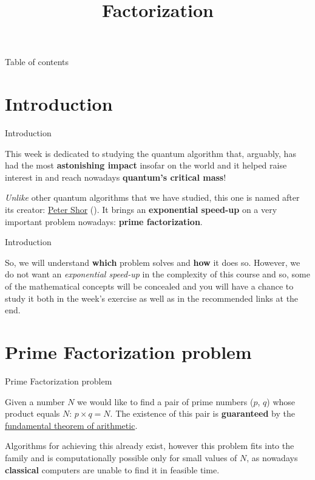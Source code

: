 \documentclass[aspectratio=43]{beamer}
\title{\q Factorization}
\begin{document}
\begin{frame}
	\titlepage
\end{frame}


\begin{frame}{Table of contents}
	\begin{card}
		\tableofcontents
	\end{card}
\end{frame}


\section{Introduction}
\begin{frame}{Introduction}
    \begin{card}
        This week is dedicated to studying the quantum algorithm that, arguably, has had the most \textbf{astonishing impact} insofar on the world and it helped raise interest in \qc and reach nowadays \textbf{quantum's critical mass}!
    \end{card}
    \begin{card}
        \textit{Unlike} other quantum algorithms that we have studied, this one is named after its creator: \href{https://en.wikipedia.org/wiki/Peter_Shor}{Peter Shor} (\textbf{\sa}). It brings an \textbf{exponential speed-up} on a very important problem nowadays: \textbf{prime factorization}.
    \end{card}
\pagenumber
\end{frame}
\begin{frame}{Introduction}
    \begin{card}
        So, we will understand \textbf{which} problem \sa solves and \textbf{how} it does so. However, we do not want an \textit{exponential speed-up} in the complexity of this course and so, some of the mathematical concepts will be concealed and you will have a chance to study it both in the week's exercise as well as in the recommended links at the end.
    \end{card}
\pagenumber
\end{frame}


\section{Prime Factorization problem}
\begin{frame}{Prime Factorization problem}
    \begin{card}
        Given a number $N$ we would like to find a pair of prime numbers ($p$, $q$) whose product equals $N$: $p\times q=N$. The existence of this pair is \textbf{guaranteed} by the \href{https://en.wikipedia.org/wiki/Fundamental_theorem_of_arithmetic}{fundamental theorem of arithmetic}.
    \end{card}
    \begin{card}
        Algorithms for achieving this already exist, however this problem fits into the \np family and is computationally possible only for small values of $N$, as nowadays \textbf{classical} computers are unable to find it in feasible time.
    \end{card}
\pagenumber
\end{frame}
\end{document}
